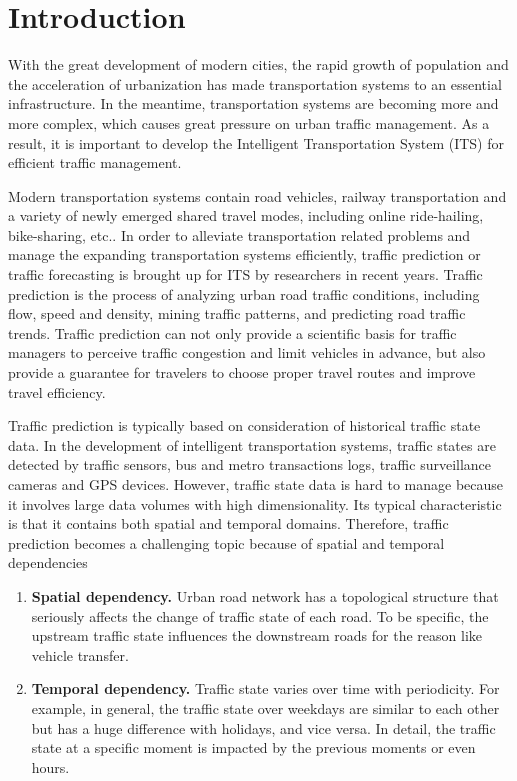 
\section{Introduction}
With the great development of modern cities, the rapid growth of population and the acceleration of urbanization has made transportation systems to an essential infrastructure. In the meantime, transportation systems are becoming more and more complex, which causes great pressure on urban traffic management. As a result, it is important to develop the Intelligent Transportation System (ITS)\cite{ITS} for efficient traffic management.

Modern transportation systems contain road vehicles, railway transportation and a variety of newly emerged shared travel modes, including online ride-hailing, bike-sharing, etc.. In order to alleviate transportation related problems and manage the expanding transportation systems efficiently, traffic prediction or traffic forecasting is brought up for ITS by researchers in recent years. Traffic prediction is the process of analyzing urban road traffic conditions, including flow, speed and density, mining traffic patterns, and predicting road traffic trends. Traffic prediction can not only provide a scientific basis for traffic managers to perceive traffic congestion and limit vehicles in advance, but also provide a guarantee for travelers to choose proper travel routes and improve travel efficiency.

Traffic prediction is typically based on consideration of historical traffic state data. In the development of intelligent transportation systems, traffic states are detected by traffic sensors, bus and metro transactions logs, traffic surveillance cameras and GPS devices. However, traffic state data is hard to manage because it involves large data volumes with high dimensionality. Its typical characteristic is that it contains both spatial and temporal domains.
Therefore, traffic prediction becomes a challenging topic because of spatial and temporal dependencies
\begin{enumerate}
    \item \textbf{Spatial dependency.} Urban road network has a topological structure that seriously affects the change of traffic state of each road. To be specific, the upstream traffic state influences the downstream roads for the reason like vehicle transfer.
    
    \item \textbf{Temporal dependency.} Traffic state varies over time with periodicity. For example, in general, the traffic state over weekdays are similar to each other but has a huge difference with holidays, and vice versa. In detail, the traffic state at a specific moment is impacted by the previous moments or even hours.
\end{enumerate}

